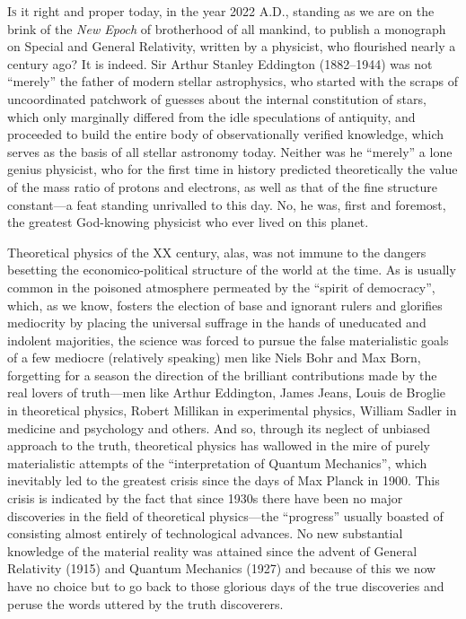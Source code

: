 \documentclass[12pt]{book}
\begin{document}
\lettrine{I}{s} it right and proper today, in the year 2022 A.D., standing as we are on the brink of the
\emph{New Epoch} of brotherhood of all mankind,
to publish a monograph on Special and General Relativity, written by a physicist,
who flourished nearly a century ago?
It is indeed.
Sir Arthur Stanley Eddington (1882--1944) was not ``merely'' the father of modern stellar astrophysics, who started with the
scraps of uncoordinated patchwork of guesses about the internal constitution of stars, which only marginally
differed from the idle speculations of antiquity, and proceeded to build the entire body of
observationally verified knowledge, which serves as the basis of all stellar astronomy today.
Neither was he ``merely'' a lone genius physicist, who for the first time in history predicted
theoretically the value of the mass ratio of protons and electrons, as well as that of the fine
structure constant---a feat standing unrivalled to this day.
No, he was, first and foremost, the greatest God-knowing physicist who ever lived on this planet.

Theoretical physics of the XX century, alas, was not immune to the dangers besetting the economico-political
structure of the world at the time.
As is usually common in the poisoned atmosphere permeated by the ``spirit of democracy'',
which, as we know, fosters the election of base and ignorant rulers and glorifies mediocrity by placing the
universal suffrage in the hands of uneducated and indolent majorities, the science was forced to pursue the false
materialistic goals of a few mediocre (relatively speaking) men like Niels Bohr and Max Born, forgetting for a season
the direction of the brilliant contributions made by the real lovers of truth---men like Arthur Eddington,
James Jeans, Louis de Broglie in theoretical physics,
Robert Millikan in experimental physics, William Sadler in medicine and psychology and others.
And so, through its neglect of unbiased approach to the truth, theoretical physics has wallowed
in the mire of purely materialistic attempts of the ``interpretation of Quantum Mechanics'',
which inevitably led to the greatest crisis since the days of Max Planck in 1900.
This crisis is indicated by the fact that since 1930s there have been no major discoveries in the field of
theoretical physics---the ``progress'' usually boasted of consisting almost entirely of technological advances.
No new substantial knowledge of the material reality was attained since the advent of General Relativity (1915)
and Quantum Mechanics (1927) and because of this we now have no choice but to go back to those glorious days
of the true discoveries and peruse the words uttered by the truth discoverers.
\end{document}
